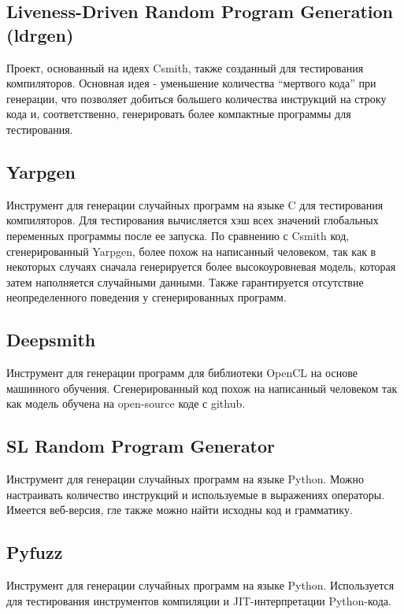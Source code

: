 \subsection{Liveness-Driven Random Program Generation (ldrgen)}

Проект, основанный на идеях Csmith, также созданный для тестирования компиляторов.
Основная идея - уменьшение количества “мертвого кода” при генерации,
что позволяет добиться большего количества инструкций на строку кода и,
соответственно, генерировать более компактные программы для тестирования. \cite{ldrgen}


\subsection{Yarpgen}

Инструмент для генерации случайных программ на языке C для тестирования компиляторов.
Для тестирования вычисляется хэш всех значений глобальных переменных программы после ее запуска.
По сравнению с Csmith код, сгенерированный Yarpgen, более похож на написанный человеком,
так как в некоторых случаях сначала генерируется более высокоуровневая модель,
которая затем наполняется случайными данными.
Также гарантируется отсутствие неопределенного поведения у сгенерированных программ. \cite{yarpgen}

\subsection{Deepsmith}

Инструмент для генерации программ для библиотеки OpenCL на основе машинного обучения.
Сгенерированный код похож на написанный человеком так как модель обучена на open-source коде с github.
\cite{deepsmith}

\subsection{SL Random Program Generator}

Инструмент для генерации случайных программ на языке Python. Можно настраивать количество инструкций и используемые в выражениях операторы. 
Имеется веб-версия, гле также можно найти исходны код и грамматику. \cite{sl}

\subsection{Pyfuzz}

Инструмент для генерации случайных программ на языке Python. Используется для тестирования
инструментов компиляции и JIT-интерпретации Python-кода. \cite{pyfuzz}

